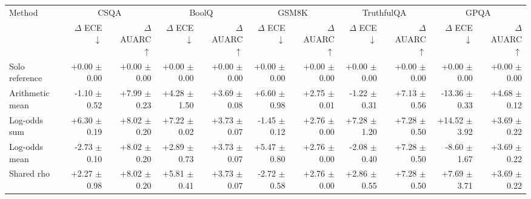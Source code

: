 \begin{tabular}{lrrrrrrrrrr}
\toprule
Method & \multicolumn{2}{c}{CSQA} & \multicolumn{2}{c}{BoolQ} & \multicolumn{2}{c}{GSM8K} & \multicolumn{2}{c}{TruthfulQA} & \multicolumn{2}{c}{GPQA} \\
 & $\Delta$ ECE $\downarrow$ & $\Delta$ AUARC $\uparrow$ & $\Delta$ ECE $\downarrow$ & $\Delta$ AUARC $\uparrow$ & $\Delta$ ECE $\downarrow$ & $\Delta$ AUARC $\uparrow$ & $\Delta$ ECE $\downarrow$ & $\Delta$ AUARC $\uparrow$ & $\Delta$ ECE $\downarrow$ & $\Delta$ AUARC $\uparrow$ \\
\midrule
Solo reference & +0.00 {\scriptsize $\pm$ 0.00} & +0.00 {\scriptsize $\pm$ 0.00} & +0.00 {\scriptsize $\pm$ 0.00} & +0.00 {\scriptsize $\pm$ 0.00} & +0.00 {\scriptsize $\pm$ 0.00} & +0.00 {\scriptsize $\pm$ 0.00} & +0.00 {\scriptsize $\pm$ 0.00} & +0.00 {\scriptsize $\pm$ 0.00} & +0.00 {\scriptsize $\pm$ 0.00} & +0.00 {\scriptsize $\pm$ 0.00} \\
Arithmetic mean & -1.10 {\scriptsize $\pm$ 0.52} & +7.99 {\scriptsize $\pm$ 0.23} & +4.28 {\scriptsize $\pm$ 1.50} & +3.69 {\scriptsize $\pm$ 0.08} & +6.60 {\scriptsize $\pm$ 0.98} & +2.75 {\scriptsize $\pm$ 0.01} & -1.22 {\scriptsize $\pm$ 0.31} & +7.13 {\scriptsize $\pm$ 0.56} & -13.36 {\scriptsize $\pm$ 0.33} & +4.68 {\scriptsize $\pm$ 0.12} \\
Log-odds sum & +6.30 {\scriptsize $\pm$ 0.19} & +8.02 {\scriptsize $\pm$ 0.20} & +7.22 {\scriptsize $\pm$ 0.02} & +3.73 {\scriptsize $\pm$ 0.07} & -1.45 {\scriptsize $\pm$ 0.12} & +2.76 {\scriptsize $\pm$ 0.00} & +7.28 {\scriptsize $\pm$ 1.20} & +7.28 {\scriptsize $\pm$ 0.50} & +14.52 {\scriptsize $\pm$ 3.92} & +3.69 {\scriptsize $\pm$ 0.22} \\
Log-odds mean & -2.73 {\scriptsize $\pm$ 0.10} & +8.02 {\scriptsize $\pm$ 0.20} & +2.89 {\scriptsize $\pm$ 0.73} & +3.73 {\scriptsize $\pm$ 0.07} & +5.47 {\scriptsize $\pm$ 0.80} & +2.76 {\scriptsize $\pm$ 0.00} & -2.08 {\scriptsize $\pm$ 0.40} & +7.28 {\scriptsize $\pm$ 0.50} & -8.60 {\scriptsize $\pm$ 1.67} & +3.69 {\scriptsize $\pm$ 0.22} \\
Shared rho & +2.27 {\scriptsize $\pm$ 0.98} & +8.02 {\scriptsize $\pm$ 0.20} & +5.81 {\scriptsize $\pm$ 0.41} & +3.73 {\scriptsize $\pm$ 0.07} & -2.72 {\scriptsize $\pm$ 0.58} & +2.76 {\scriptsize $\pm$ 0.00} & +2.86 {\scriptsize $\pm$ 0.55} & +7.28 {\scriptsize $\pm$ 0.50} & +7.69 {\scriptsize $\pm$ 3.71} & +3.69 {\scriptsize $\pm$ 0.22} \\

\end{tabular}
